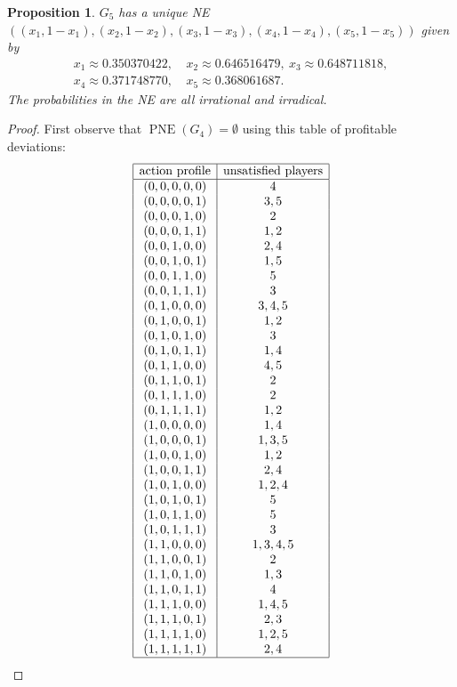 \documentclass[preprint,12pt,authoryear]{elsarticle}
\newtheorem{proposition}[theorem]{Proposition}
\DeclareMathOperator{\PNE}{PNE}
\begin{document}
\begin{proposition}\label{prop:n=5}
  $G_5$ has a unique NE $((x_1,1-x_1),(x_2,1-x_2),(x_3,1-x_3),(x_4,1-x_4),(x_5,1-x_5))$ 
  given by
  \begin{align*}
    x_1\approx0.350370422,&~x_2\approx0.646516479,~x_3\approx0.648711818,\\
    x_4\approx0.371748770,&~x_5\approx0.368061687.
  \end{align*}
  The probabilities in the NE are all irrational and irradical.
\end{proposition}
\begin{proof}
  First observe that $\PNE(G_4)=\emptyset$ using this table of profitable deviations:
  {\footnotesize
  \begin{align*}
    \begin{array}{|c|c|}
      \hline
      \text{action profile}&\text{unsatisfied players}\\
      \hline
      (0,0,0,0,0)&4\\
      (0,0,0,0,1)&3,5\\
      (0,0,0,1,0)&2\\
      (0,0,0,1,1)&1,2\\
      (0,0,1,0,0)&2,4\\
      (0,0,1,0,1)&1,5\\
      (0,0,1,1,0)&5\\
      (0,0,1,1,1)&3\\
      (0,1,0,0,0)&3,4,5\\
      (0,1,0,0,1)&1,2\\
      (0,1,0,1,0)&3\\
      (0,1,0,1,1)&1,4\\
      (0,1,1,0,0)&4,5\\
      (0,1,1,0,1)&2\\
      (0,1,1,1,0)&2\\
      (0,1,1,1,1)&1,2\\
      (1,0,0,0,0)&1,4\\
      (1,0,0,0,1)&1,3,5\\
      (1,0,0,1,0)&1,2\\
      (1,0,0,1,1)&2,4\\
      (1,0,1,0,0)&1,2,4\\
      (1,0,1,0,1)&5\\
      (1,0,1,1,0)&5\\
      (1,0,1,1,1)&3\\
      (1,1,0,0,0)&1,3,4,5\\
      (1,1,0,0,1)&2\\
      (1,1,0,1,0)&1,3\\
      (1,1,0,1,1)&4\\
      (1,1,1,0,0)&1,4,5\\
      (1,1,1,0,1)&2,3\\
      (1,1,1,1,0)&1,2,5\\
      (1,1,1,1,1)&2,4\\
      \hline
    \end{array}
  \end{align*}
  }
  

\end{proof}
\end{document}
